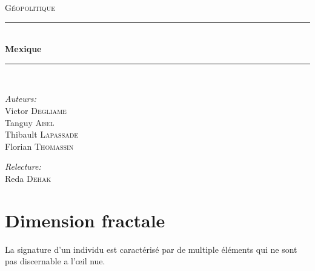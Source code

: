 \documentclass[pdftex,12pt,a4paper]{report}
\newcommand{\HRule}{\rule{\linewidth}{0.5mm}}
\begin{document}
\begin{titlepage}
\begin{center}
\textsc{\LARGE Géopolitique}\\[1.5cm]

\HRule \\[0.4cm]
{\huge \bfseries Mexique}\\[0.4cm]
\HRule \\[1.5cm]
\end{center}

\begin{minipage}{0.4\textwidth}
	\begin{flushleft} \large
		\emph{Auteurs:}\\
			Victor \textsc{Degliame} \\
			Tanguy \textsc{Abel} \\
			Thibault \textsc{Lapassade} \\
			Florian \textsc{Thomassin} \\
	\end{flushleft}
\end{minipage}
\begin{minipage}{0.4\textwidth}
	\begin{flushright} \large
		\emph{Relecture:} \\
              Reda \textsc{Dehak}
	\end{flushright}
\end{minipage}
\end{titlepage}

\tableofcontents

\section{Dimension fractale}
La signature d'un individu est caractérisé par de multiple éléments qui ne sont pas discernable a l'œil nue.\\
\end{document}
